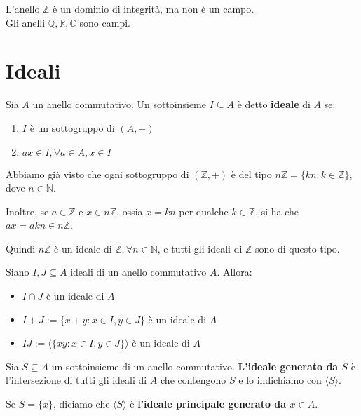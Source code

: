 \documentclass[../main.tex]{subfiles}
\begin{document}
\begin{example}
    L'anello $\mathbb{Z}$ è un dominio di integrità, ma non è un campo.\\
    Gli anelli $\mathbb{Q} ,\mathbb{R} ,\mathbb{C} $ sono campi.
\end{example}

\section{Ideali}

\begin{definition}[Ideale]
    Sia $A$ un anello commutativo. Un sottoinsieme $I \subseteq A$ è detto \textbf{ideale} di $A$ se:
    \begin{enumerate}[label=(\roman*)]
        \item $I$ è un sottogruppo di $(A,+)$
        \item $ax \in I, \forall a \in A, x \in I$
    \end{enumerate}
\end{definition}

\begin{example}
    Abbiamo già visto che ogni sottogruppo di $(\mathbb{Z} , +)$ è del tipo $n \mathbb{Z} = \{kn : k \in \mathbb{Z} \}$, dove $n \in \mathbb{N}$.

    Inoltre, se $a \in \mathbb{Z} $ e $x \in n\mathbb{Z} $, ossia $x=kn$ per qualche $k \in \mathbb{Z} $, si ha che $ax=akn \in n \mathbb{Z} $.

    Quindi $n \mathbb{Z} $ è un ideale di $\mathbb{Z}, \forall n \in \mathbb{N}  $, e tutti gli ideali di $\mathbb{Z} $ sono di questo tipo.
\end{example}

\begin{remark}
    Siano $I,J \subseteq A$ ideali di un anello commutativo $A$. Allora:
    \begin{itemize}
        \item $I \cap J$ è un ideale di $A$
        \item $I + J := \{x+y : x \in I, y \in J\}$ è un ideale di $A$
        \item $IJ := \langle \{xy : x \in I, y \in J\} \rangle$ è un ideale di $A$
    \end{itemize}
\end{remark}

\begin{definition}
    Sia $S \subseteq A$ un sottoinsieme di un anello commutativo. \textbf{L'ideale generato da $S$} è l'intersezione di tutti gli ideali di $A$ che contengono $S$ e lo indichiamo con $\langle S \rangle$.

    Se $S =\{x\}$, diciamo che $\langle S \rangle$ è \textbf{l'ideale principale generato da $x \in A$}.
\end{definition}
\end{document}

